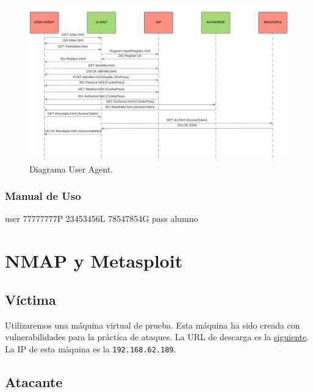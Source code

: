 \documentclass[a4,12pt,onecolum]{article}
\begin{document}
\begin{figure}[htbp]
\centering
\includegraphics[width=1.1\textwidth]{./images/oauth/diagrama_flujo_useragent.png}
\caption{Diagrama User Agent.}
\label{fig:oauth2}
\end{figure}


\subsubsection{Manual de Uso}

user
77777777P
23453456L
78547854G
pass
alumno



\clearpage
\section{NMAP y Metasploit}

\subsection{Víctima}
Utilizaremos una máquina virtual de prueba. Esta máquina ha sido creada con vulnerabilidades para la práctica de ataques. La URL de descarga es la \href{wiki.inf.um.es/metasploitable2/metasploitable-linux-2.0.0.zip}{siguiente}. \\

La IP de esta máquina es la \texttt{192.168.62.189}.

\subsection{Atacante}
\end{document}
